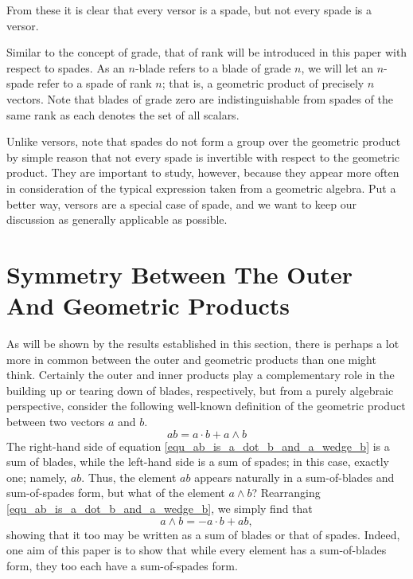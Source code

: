 \documentclass{birkjour}
\theoremstyle{definition}
\theoremstyle{remark}
\numberwithin{equation}{section}
\begin{document}
From these it is clear that every versor is a spade, but not every spade is a versor.

Similar to the concept of grade, that of rank will be introduced in this paper with respect to spades.  As an $n$-blade
refers to a blade of grade $n$, we will let an $n$-spade refer to a spade of rank $n$; that is, a geometric
product of precisely $n$ vectors.  Note that blades of grade zero
are indistinguishable from spades of the same rank as each denotes the set of all scalars.

Unlike versors, note that spades do not form a group over the geometric product by simple reason that not every
spade is invertible with respect to the geometric product.  They are important to study, however,
because they appear more often in consideration of the typical expression taken from a geometric algebra.
Put a better way, versors are a special case of spade, and we want to keep our discussion as generally applicable as possible.

\section{Symmetry Between The Outer And Geometric Products}

As will be shown by the results established in this section, there is perhaps a lot more in
common between the outer and geometric products than one might think.  Certainly the outer and
inner products play a complementary role in the building up or tearing down of blades, respectively, but from a
purely algebraic perspective, consider the following well-known definition of the geometric product
between two vectors $a$ and $b$.
\begin{equation}\label{equ_ab_is_a_dot_b_and_a_wedge_b}
ab = a\cdot b + a\wedge b
\end{equation}
The right-hand side of equation \eqref{equ_ab_is_a_dot_b_and_a_wedge_b} is a sum of blades, while the left-hand side is a sum of spades;
in this case, exactly one; namely, $ab$.  Thus, the element $ab$ appears naturally in a sum-of-blades and
sum-of-spades form, but what of the element $a\wedge b$?  Rearranging \eqref{equ_ab_is_a_dot_b_and_a_wedge_b}, we simply find that
\begin{equation}\label{equ_a_wedge_b_is_neg_a_dot_b_and_ab}
a\wedge b = -a\cdot b + ab,
\end{equation}
showing that it too may be written as a sum of blades or that of spades.  Indeed, one aim of this paper
is to show that while every element has a sum-of-blades form, they too each have a sum-of-spades form.
\end{document}
